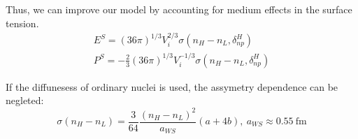 \documentclass[11pt,letter]{article}
\begin{document}
Thus, 
we can improve our model by accounting for medium effects in the surface tension.
\begin{equation}
 \begin{split}
  E^S= (36\pi)^{1/3}V_i^{2/3}\sigma(n_H-n_L,\delta^H_{np})\\
  P^S=-\frac{2}{3}(36\pi)^{1/3}V_i^{-1/3}\sigma(n_H-n_L,\delta^H_{np})
 \end{split}
\end{equation}

If the diffunesess of ordinary nuclei is used, the assymetry dependence can be negleted:\
\begin{equation}
 \sigma(n_H-n_L) = \frac{3}{64} \frac{(n_H-n_L)^2}{a_{WS}}  (a  +4 b),\ a_{WS}\approx 0.55\ \text{fm}
\end{equation}
\end{document}

